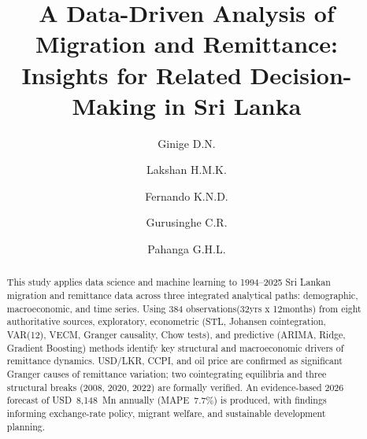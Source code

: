 \documentclass[sigconf]{acmart}
\begin{document}
\title{A Data-Driven Analysis of Migration and Remittance: Insights for Related Decision-Making in Sri Lanka}

\author{Ginige D.N.}

\author{Lakshan H.M.K.}

\author{Fernando K.N.D.}

\author{Gurusinghe C.R.}

\author{Pahanga G.H.L.}

\begin{abstract}
This study applies data science and machine learning to 1994--2025 Sri Lankan migration and remittance data across three integrated analytical paths: demographic, macroeconomic, and time series. Using 384 observations(32yrs x 12months) from eight authoritative sources, exploratory, econometric (STL, Johansen cointegration, VAR(12), VECM, Granger causality, Chow tests), and predictive (ARIMA, Ridge, Gradient Boosting) methods identify key structural and macroeconomic drivers of remittance dynamics. USD/LKR, CCPI, and oil price are confirmed as significant Granger causes of remittance variation; two cointegrating equilibria and three structural breaks (2008, 2020, 2022) are formally verified. An evidence-based 2026 forecast of USD~8,148~Mn annually (MAPE~7.7\%) is produced, with findings informing exchange-rate policy, migrant welfare, and sustainable development planning.
\end{abstract}


\maketitle
\end{document}
